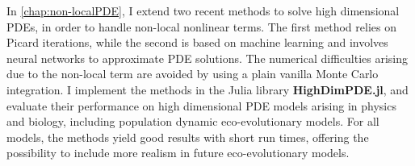 In \cref{chap:non-localPDE}, I extend two recent methods to solve high dimensional PDEs, in order to handle non-local nonlinear terms. The first method relies on Picard iterations, while the second is based on machine learning and involves neural networks to approximate PDE solutions. The numerical difficulties arising due to the non-local term are avoided by using a plain vanilla Monte Carlo integration. I implement the methods in the Julia library \textbf{HighDimPDE.jl}, and evaluate their performance on high dimensional PDE models arising in physics and biology, including population dynamic eco-evolutionary models. For all models, the methods yield good results with short run times, offering the possibility to include more realism in future eco-evolutionary models.

\newpage


